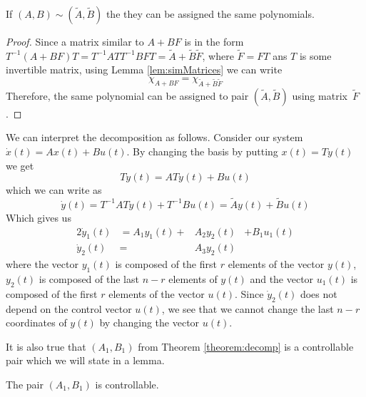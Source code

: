 \begin{lemma}
	\label{lem:simPairsAssignablePolynomial}
	If $(A,B)\sim(\widetilde{A},\widetilde{B})$ the they can be assigned the same polynomials.
\end{lemma}

\begin{proof}
	Since a matrix similar to $A+BF$ is in the form $T^{-1}(A+BF)T=T^{-1}ATT^{-1}BFT=\widetilde{A}+\widetilde{B}\widetilde{F}$, where $\widetilde{F}=FT$ ans $T$ is some invertible matrix, using Lemma \ref{lem:simMatrices} we can write $$\chi_{A+BF}=\chi_{\widetilde{A}+\widetilde{B}\widetilde{F}}$$
	Therefore, the same polynomial can be assigned to pair $(\widetilde{A},\widetilde{B})$ using matrix~$\widetilde{F}$.
\end{proof}

We can interpret the decomposition as follows. Consider our system $\dot{x}(t)=Ax(t)+Bu(t)$. By changing the basis by putting $x(t)=Ty(t)$ we get 
$$T\dot{y}(t)=ATy(t)+Bu(t)$$ 
which we can write as 
$$\dot{y}(t)=T^{-1}ATy(t)+T^{-1}Bu(t)=\widetilde{A}y(t)+\widetilde{B}u(t)$$ 
Which gives us 
\begin{alignat*}{2}
	\dot{y}_1(t)&=A_1y_1(t)+&A_2y_2(t)&+B_1u_1(t) \\
	\dot{y}_2(t)&=&A_3y_2(t)&
\end{alignat*}
where the vector $y_1(t)$ is composed of the first $r$ elements of the vector $y(t)$, $y_2(t)$ is composed of the last $n-r$ elements of $y(t)$ and the vector $u_1(t)$ is composed of the first $r$ elements of the vector $u(t)$. Since $\dot{y}_2(t)$ does not depend on the control vector $u(t)$, we see that we cannot change the last $n-r$ coordinates of $y(t)$ by changing the vector $u(t)$.

It is also true that $(A_1,B_1)$ from Theorem \ref{theorem:decomp} is a controllable pair which we will state in a lemma.

\begin{lemma}
	\label{lem:A_1B_1controllable}
	The pair $(A_1,B_1)$ is controllable.
\end{lemma}

